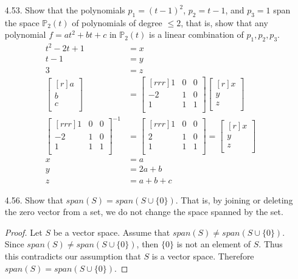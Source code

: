 \documentclass[12pt]{article}
\begin{document}
\begin{enumerate}
\item[4.53.] Show that the polynomials $p_1=(t-1)^2$, $p_2=t-1$, and $p_3=1$ span the space $\mathbb{P}_2(t)$ of polynomials of degree $\leq 2$, that is, show that any polynomial $f=at^2+bt+c$ in $\mathbb{P}_2(t)$ is a linear combination of $p_1,p_2,p_3$.\\
	\begin{align*}
	t^2-2t+1 &=x\\
	t-1 &= y\\
	3 &= z\\
	\begin{bmatrix}[r]a\\b\\c\\ \end{bmatrix}
	&= \begin{bmatrix}[rrr] 1&0&0\\-2&1&0\\1&1&1\\ \end{bmatrix}
	\begin{bmatrix}[r]x\\y\\z\\ \end{bmatrix}\\
	\begin{bmatrix}[rrr] 1&0&0\\-2&1&0\\1&1&1\\ \end{bmatrix}^{-1}
	&= \begin{bmatrix}[rrr] 1&0&0\\2&1&0\\1&1&1\\ \end{bmatrix}
	= \begin{bmatrix}[r] x\\y\\z\\ \end{bmatrix}\\
	x &= a\\
	y &= 2a+b\\
	z &= a+b+c
	\end{align*}

\item[4.56.] Show that $span(S)=span(S \cup \{0\})$. That is, by joining or deleting the zero vector from a set, we do not change the space spanned by the set.
	\begin{proof}
	Let $S$ be a vector space. Assume that $span(S) \neq span(S \cup \{0\})$. Since $span(S) \neq span(S \cup \{0\})$, then $\{0\}$ is not an element of $S$. Thus this contradicts our assumption that $S$ is a vector space. Therefore $span(S) = span(S \cup \{0\})$.
	\end{proof}

\end{enumerate}
\end{document}
